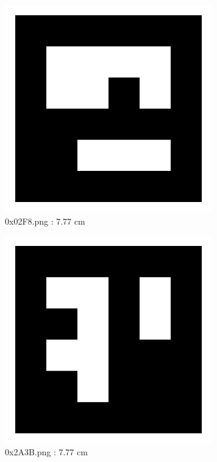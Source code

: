 \documentclass[11pt,a4,BCOR=0cm]{scrartcl}
\begin{document}
\begin{figure}
  \centering
    \includegraphics[natwidth=400,natheight=400,width=9cm]{0x02F8.png}
    \caption{0x02F8.png : 7.77 cm}
    \label{fig:0x02F8.png}
  
\end{figure} 

\begin{figure}
  \centering
    \includegraphics[natwidth=400,natheight=400,width=9cm]{0x2A3B.png}
    \caption{0x2A3B.png : 7.77 cm}
    \label{fig:0x2A3B.png}
  
\end{figure} 

\clearpage
\end{document}
